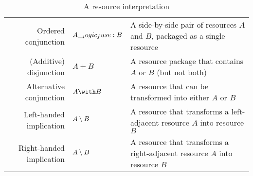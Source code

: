 \begin{table}[tbp]
  \centering
  \begin{tabular}{@{}rll@{}}
    Ordered conjunction & $A \__logic_fuse: B$ & A side-by-side pair of resources $A$ and $B$, packaged as a single resource \\
    (Additive) disjunction & $A \plus B$ & A resource package that contains $A$ or $B$ (but not both) \\
    Alternative conjunction & $A \with B$ & A resource that can be transformed into either $A$ or $B$ \\
    Left-handed implication & $A \mathbin { \setminus } B$ & A resource that transforms a left-adjacent resource $A$ into resource $B$ \\
    Right-handed implication & $A \mathbin { \setminus } B$ & A resource that transforms a right-adjacent resource $A$ into resource $B$
  \end{tabular}
  \caption{A resource interpretation}
\end{table}

